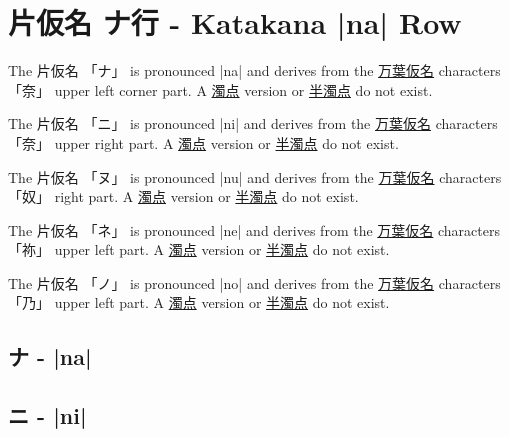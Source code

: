 \section{片仮名  ナ行 - Katakana |na| Row} \label{sec:KatakanaNaRow}


\label{letter:na} The  片仮名 {「ナ」} is pronounced  |na| and  derives from the
\hyperref[sec:Manyogana]{万葉仮名} characters {「奈」} upper left corner part.
A \hyperref[sec:Dakuten]{濁点} version  or \hyperref[sec:Handakuten]{半濁点} do
not exist.

\label{letter:ni} The  片仮名 {「ニ」} is pronounced  |ni| and  derives from the
\hyperref[sec:Manyogana]{万葉仮名} characters {「奈」} upper right part.
A \hyperref[sec:Dakuten]{濁点} version  or \hyperref[sec:Handakuten]{半濁点} do
not exist.

\label{letter:nu} The  片仮名 {「ヌ」} is pronounced  |nu| and  derives from the
\hyperref[sec:Manyogana]{万葉仮名} characters {「奴」} right part.
A \hyperref[sec:Dakuten]{濁点} version  or \hyperref[sec:Handakuten]{半濁点} do
not exist.



\newpage

\label{letter:ne} The  片仮名 {「ネ」} is pronounced  |ne| and  derives from the
\hyperref[sec:Manyogana]{万葉仮名} characters {「祢」} upper left  part.
A \hyperref[sec:Dakuten]{濁点} version  or \hyperref[sec:Handakuten]{半濁点} do
not exist.

\label{letter:no} The  片仮名 {「ノ」} is pronounced  |no| and  derives from the
\hyperref[sec:Manyogana]{万葉仮名} characters {「乃」} upper left part.
A \hyperref[sec:Dakuten]{濁点} version  or \hyperref[sec:Handakuten]{半濁点} do
not exist.



\subsection{ナ - |na|} \label{sec:KatakanaNa}

 

\subsection{ニ - |ni|} \label{sec:KatakanaNi}

